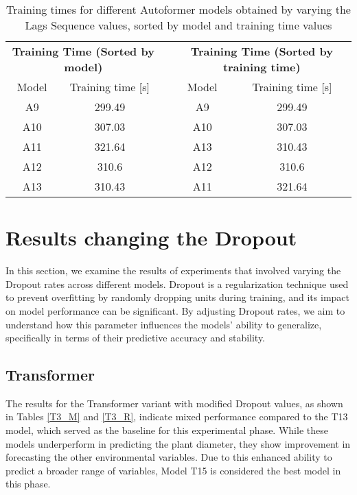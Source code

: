 \begin{table}[]
    \begin{tabular}{ccccc}
    \multicolumn{2}{c}{\textbf{Training   Time (Sorted by model)}} &  & \multicolumn{2}{c}{\textbf{Training Time (Sorted   by training time)}} \\
    Model             & Training time {[}s{]}                      &  & Model                 & Training time {[}s{]}                          \\
    A9                & \cellcolor[HTML]{63BE7B}299.49             &  & A9                    & \cellcolor[HTML]{63BE7B}299.49                 \\
    A10               & \cellcolor[HTML]{CEDD81}307.03             &  & A10                   & \cellcolor[HTML]{CEDD81}307.03                 \\
    A11               & \cellcolor[HTML]{F8696B}321.64             &  & A13                   & \cellcolor[HTML]{FFEB84}310.43                 \\
    A12               & \cellcolor[HTML]{FFEA84}310.6              &  & A12                   & \cellcolor[HTML]{FFEA84}310.6                  \\
    A13               & \cellcolor[HTML]{FFEB84}310.43             &  & A11                   & \cellcolor[HTML]{F8696B}321.64                
    \end{tabular}
    \caption{Training times for different Autoformer models obtained  by varying the Lags Sequence values, sorted by model and training time values}
    \label{A2_T}
    \end{table}

\section{Results changing the Dropout}
In this section, we examine the results of experiments that involved varying the Dropout rates across different models. Dropout is a regularization technique used to prevent overfitting by randomly dropping units during training, and its impact on model performance can be significant. By adjusting Dropout rates, we aim to understand how this parameter influences the models' ability to generalize, specifically in terms of their predictive accuracy and stability.

\subsection{Transformer}
The results for the Transformer variant with modified Dropout values, as shown in Tables \ref{T3_M} and \ref{T3_R}, indicate mixed performance compared to the T13 model, which served as the baseline for this experimental phase. While these models underperform in predicting the plant diameter, they show improvement in forecasting the other environmental variables. Due to this enhanced ability to predict a broader range of variables, Model T15 is considered the best model in this phase.


